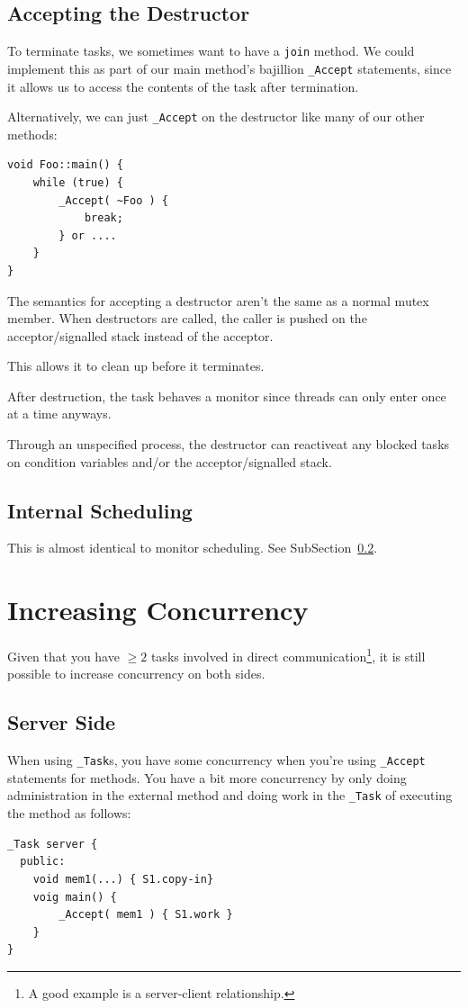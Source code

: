             \subsection{Accepting the Destructor} %
            \label{sub:accepting_the_destructor}
                To terminate tasks, we sometimes want to have a \verb|join| method.
                We could implement this as part of our main method's bajillion \verb|_Accept| statements, since it allows us to access the contents of the task after termination.

                Alternatively, we can just \verb|_Accept| on the destructor like many of our other methods:
                \begin{lstlisting}
void Foo::main() {
    while (true) {
        _Accept( ~Foo ) {
            break;
        } or ....
    }
}
                \end{lstlisting}
                The semantics for accepting a destructor aren't the same as a normal mutex member.
                When destructors are called, the caller is pushed on the acceptor/signalled stack instead of the acceptor.

                This allows it to clean up before it terminates.

                After destruction, the task behaves a monitor since threads can only enter once at a time anyways.

                Through an unspecified process, the destructor can reactiveat any blocked tasks on condition variables and/or the acceptor/signalled stack.
            \subsection{Internal Scheduling} %
            \label{sub:internal_scheduling}
                This is almost identical to monitor scheduling. See SubSection~\ref{sub:internal_scheduling}.
        \section{Increasing Concurrency} %
        \label{sec:increasing_concurrency}
            Given that you have $\ge2$ tasks involved in direct communication\footnote{A good example is a server-client relationship.}, it is still possible to increase concurrency on both sides.
            \subsection{Server Side} %
            \label{sub:server_side}
                When using \verb|_Task|s, you have some concurrency when you're using \verb|_Accept| statements for methods.
                You have a bit more concurrency by only doing administration in the external method and doing work in the \verb|_Task| of executing the method as follows:
                \begin{lstlisting}
_Task server {
  public:
    void mem1(...) { S1.copy-in}
    voig main() {
        _Accept( mem1 ) { S1.work }
    }
}
                \end{lstlisting}
